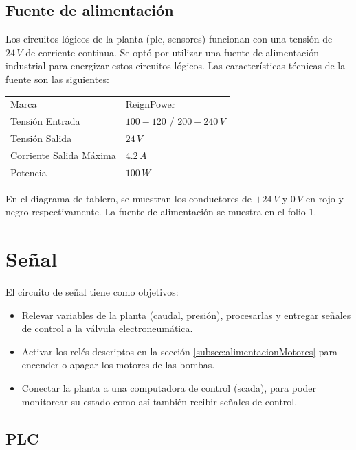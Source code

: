 \subsection{Fuente de alimentación}
\label{subsec:fuenteAlim}
Los circuitos lógicos de la planta (\gls{plc}, sensores) funcionan con una
tensión de $24\,V$ de corriente continua.
Se optó por utilizar una fuente de alimentación industrial para energizar estos
circuitos lógicos.
Las características técnicas de la fuente son las siguientes:
\begin{center}
\begin{tabular}{|l|l|}
\hline
Marca & ReignPower\\
Tensión Entrada& $100-120$ / $200-240\,V$\\
Tensión Salida& $24\,V$\\
Corriente Salida Máxima& $4.2\,A$\\
Potencia & $100\,W$\\
\hline
\end{tabular}
\end{center}

En el diagrama de tablero, se muestran los conductores de $+24\,V$ y $0\,V$ en
rojo y negro respectivamente.
La fuente de alimentación se muestra en el folio 1.

\section{Señal}
\label{sec:Senal}

El circuito de señal tiene como objetivos:
\begin{itemize}
 \item Relevar variables de la planta (caudal, presión), procesarlas y entregar
señales de control a la válvula electroneumática.
\item Activar los relés descriptos en la sección
\ref{subsec:alimentacionMotores} para encender o apagar los motores de las
bombas.
\item Conectar la planta a una computadora de control (\gls{scada}), para poder
monitorear su estado como así también recibir señales de control.
\end{itemize}

\subsection{PLC}
\label{subsec:plc}

